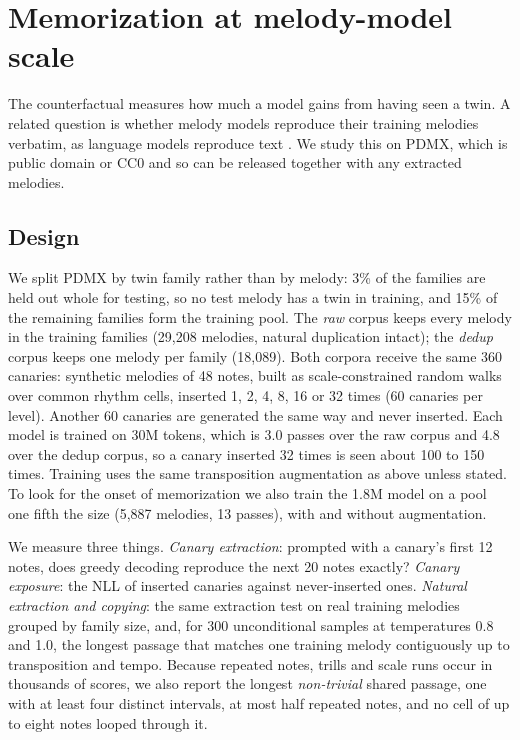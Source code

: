 \documentclass[ProofPDF]{./Styles/Jnls-Template-V3}
\begin{document}
\section{Memorization at melody-model scale}\label{sec:memorization}

The counterfactual measures how much a model gains from having seen a twin. A related question is whether melody models reproduce their training melodies verbatim, as language models reproduce text \citep{carlini2021extracting}. We study this on PDMX, which is public domain or CC0 and so can be released together with any extracted melodies.

\subsection{Design}
We split PDMX by twin family rather than by melody: 3\% of the families are held out whole for testing, so no test melody has a twin in training, and 15\% of the remaining families form the training pool. The \textit{raw} corpus keeps every melody in the training families (29,208 melodies, natural duplication intact); the \textit{dedup} corpus keeps one melody per family (18,089). Both corpora receive the same 360 canaries: synthetic melodies of 48 notes, built as scale-constrained random walks over common rhythm cells, inserted 1, 2, 4, 8, 16 or 32 times (60 canaries per level). Another 60 canaries are generated the same way and never inserted. Each model is trained on 30M tokens, which is 3.0 passes over the raw corpus and 4.8 over the dedup corpus, so a canary inserted 32 times is seen about 100 to 150 times. Training uses the same transposition augmentation as above unless stated. To look for the onset of memorization we also train the 1.8M model on a pool one fifth the size (5,887 melodies, 13 passes), with and without augmentation.

We measure three things. \textit{Canary extraction}: prompted with a canary's first 12 notes, does greedy decoding reproduce the next 20 notes exactly? \textit{Canary exposure}: the NLL of inserted canaries against never-inserted ones. \textit{Natural extraction and copying}: the same extraction test on real training melodies grouped by family size, and, for 300 unconditional samples at temperatures 0.8 and 1.0, the longest passage that matches one training melody contiguously up to transposition and tempo. Because repeated notes, trills and scale runs occur in thousands of scores, we also report the longest \textit{non-trivial} shared passage, one with at least four distinct intervals, at most half repeated notes, and no cell of up to eight notes looped through it.
\end{document}
